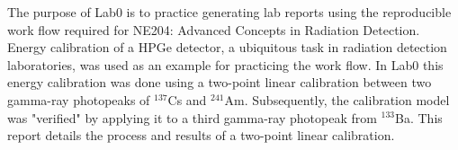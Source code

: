 The purpose of Lab0 is to practice generating lab reports using the reproducible work flow required for NE204: Advanced Concepts in Radiation Detection. Energy calibration of a HPGe detector, a ubiquitous task in radiation detection laboratories, was used as an example for practicing the work flow. In Lab0 this energy calibration was done using a two-point linear calibration between two gamma-ray photopeaks of $^{137}$Cs and $^{241}$Am. Subsequently, the calibration model was "verified" by applying it to a third gamma-ray photopeak from $^{133}$Ba. This report details the process and results of a two-point linear calibration.

